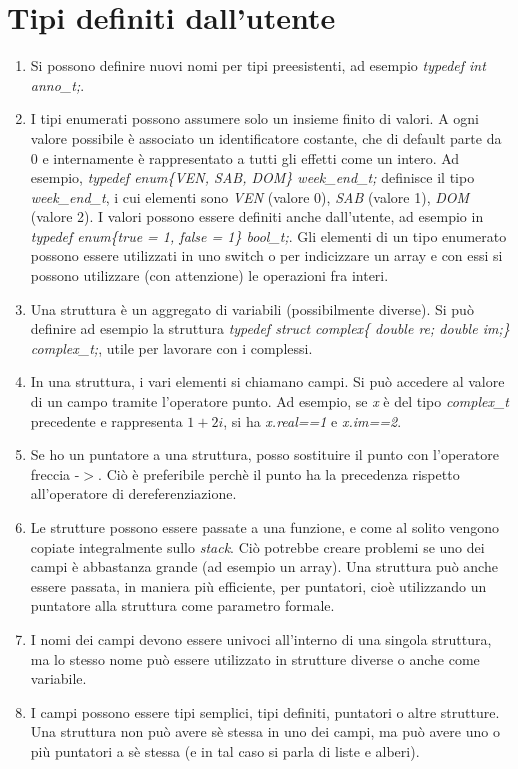 \documentclass[a4paper,11pt]{article}
\begin{document}
\section{Tipi definiti dall'utente}
\begin{enumerate}[resume]
	\item Si possono definire nuovi nomi per tipi preesistenti, ad esempio \textit{typedef int anno\_t;}.
	\item I tipi enumerati possono assumere solo un insieme finito di valori. A ogni valore possibile è associato un identificatore costante, che di default parte da 0 e internamente è rappresentato a tutti gli effetti come un intero. Ad esempio, \textit{typedef enum\{VEN, SAB, DOM\} week\_end\_t;} definisce il tipo \textit{week\_end\_t}, i cui elementi sono \textit{VEN} (valore 0), \textit{SAB} (valore 1), \textit{DOM} (valore 2). I valori possono essere definiti anche dall'utente, ad esempio in \textit{typedef enum\{true = 1, false = 1\} bool\_t;}. Gli elementi di un tipo enumerato possono essere utilizzati in uno switch o per indicizzare un array e con essi si possono utilizzare (con attenzione) le operazioni fra interi.
	\item Una struttura è un aggregato di variabili (possibilmente diverse). Si può definire ad esempio la struttura \textit{typedef struct complex\{ double re; double im;\} complex\_t;}, utile per lavorare con i complessi.
	\item In una struttura, i vari elementi si chiamano campi. Si può accedere al valore di un campo tramite l'operatore punto. Ad esempio, se \textit{x} è del tipo \textit{complex\_t} precedente e rappresenta $1+2i$, si ha \textit{x.real==1} e \textit{x.im==2}.
	\item Se ho un puntatore a una struttura, posso sostituire il punto con l'operatore freccia -$>$. Ciò è preferibile perchè il punto ha la precedenza rispetto all'operatore di dereferenziazione.
	\item Le strutture possono essere passate a una funzione, e come al solito vengono copiate integralmente sullo \textit{stack}. Ciò potrebbe creare problemi se uno dei campi è abbastanza grande (ad esempio un array). Una struttura può anche essere passata, in maniera più efficiente, per puntatori, cioè utilizzando un puntatore alla struttura come parametro formale.
	\item I nomi dei campi devono essere univoci all'interno di una singola struttura, ma lo stesso nome può essere utilizzato in strutture diverse o anche come variabile.
	\item I campi possono essere tipi semplici, tipi definiti, puntatori o altre strutture. Una struttura non può avere sè stessa in uno dei campi, ma può avere uno o più puntatori a sè stessa (e in tal caso si parla di liste e alberi).
\end{enumerate}
\end{document}
